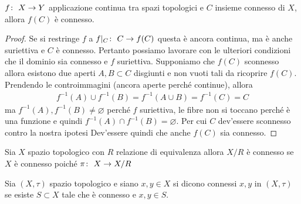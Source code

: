 \begin{theorem}
	\label{thr:3.21.3}
	$f \colon\ X \rightarrow Y$ applicazione continua tra spazi topologici e $C$ insieme connesso di $X$, allora $f(C)$ è connesso. 
\end{theorem} 
\begin{proof}
	Se si restringe $f$ a $f|_C \colon\ C \rightarrow f(C)$ questa è ancora continua, ma è anche suriettiva e $C$ è connesso. Pertanto possiamo lavorare con le ulteriori condizioni che il dominio sia connesso e $f$ suriettiva. Supponiamo che $f(C)$ sconnesso allora esistono due aperti $A, B \subset C$ disgiunti e non vuoti tali da ricoprire $f(C)$. Prendendo le controimmagini (ancora aperte perché continue), allora 
	\begin{equation}
	\begin{aligned}
		f^{-1}(A) \cup f^{-1}(B) = f^{-1}(A \cup B) = f^{-1}(C) = C
	\end{aligned}
	\end{equation}
	ma $f^{-1}(A), f^{-1}(B) \neq \varnothing$ perché $f$ suriettiva, le fibre non si toccano perché è una funzione e quindi $f^{-1}(A) \cap f^{-1}(B) = \varnothing$. Per cui $C$ dev'essere sconnesso contro la nostra ipotesi Dev'essere quindi che anche $f(C)$ sia connesso.
\end{proof}

\begin{remark}
	Sia $X$ spazio topologico con $R$ relazione di equivalenza allora $X/R$ è connesso se $X$ è connesso poiché $\pi \colon\ X \rightarrow X/R$
\end{remark} 

\begin{definition}
	Sia $(X, \tau)$ spazio topologico e siano $x, y \in X$ si dicono connessi $x, y$ in $(X, \tau)$ se esiste $S \subset X$ tale che è connesso e $x, y\in S$.
\end{definition} 


